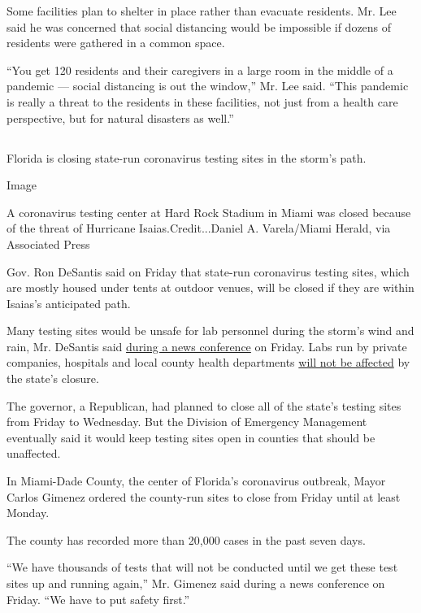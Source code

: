 Some facilities plan to shelter in place rather than evacuate residents.
Mr. Lee said he was concerned that social distancing would be impossible
if dozens of residents were gathered in a common space.

``You get 120 residents and their caregivers in a large room in the
middle of a pandemic --- social distancing is out the window,'' Mr. Lee
said. ``This pandemic is really a threat to the residents in these
facilities, not just from a health care perspective, but for natural
disasters as well.''

\hypertarget{-3}{%
\subsection{}\label{-3}}

Florida is closing state-run coronavirus testing sites in the storm's
path.

Image

A coronavirus testing center at Hard Rock Stadium in Miami was closed
because of the threat of Hurricane Isaias.Credit...Daniel A.
Varela/Miami Herald, via Associated Press

Gov. Ron DeSantis said on Friday that state-run coronavirus testing
sites, which are mostly housed under tents at outdoor venues, will be
closed if they are within Isaias's anticipated path.

Many testing sites would be unsafe for lab personnel during the storm's
wind and rain, Mr. DeSantis said
\href{https://www.youtube.com/watch?v=FsKIF5je_bo}{during a news
conference} on Friday. Labs run by private companies, hospitals and
local county health departments
\href{https://www.floridadisaster.org/news-media/news/20200729-all-state-supported-testing-sites-temporarily-close-for-potential-tropical-cyclone-nine/}{will
not be affected} by the state's closure.

The governor, a Republican, had planned to close all of the state's
testing sites from Friday to Wednesday. But the Division of Emergency
Management eventually said it would keep testing sites open in counties
that should be unaffected.

In Miami-Dade County, the center of Florida's coronavirus outbreak,
Mayor Carlos Gimenez ordered the county-run sites to close from Friday
until at least Monday.

The county has recorded more than 20,000 cases in the past seven days.

``We have thousands of tests that will not be conducted until we get
these test sites up and running again,'' Mr. Gimenez said during a news
conference on Friday. ``We have to put safety first.''

